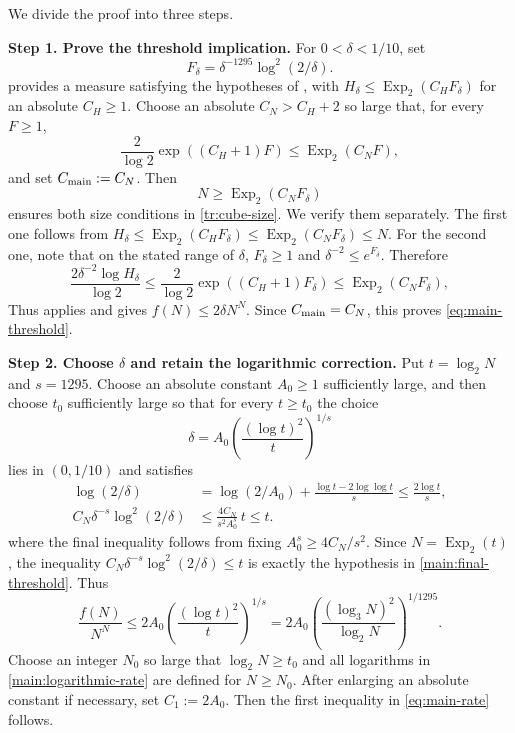 \documentclass[twoside]{aomart}
\makeatletter
\theoremstyle{paperplain}
\theoremstyle{paperdefinition}
\renewenvironment{proof}[1][\proofname]{\par\pushQED{\qed}%
  \normalfont\topsep6\p@\@plus3\p@\relax\trivlist
  \item[\hskip\labelsep\itshape #1\@addpunct{.}]\ignorespaces
}{\popQED\endtrivlist\@endpefalse}
\numberwithin{equation}{section}
\makeatother
\begin{document}
\begin{proof}[Proof of \Cref{thm:main}]
We divide the proof into three steps.	
	
\par
\medskip
\noindent\textbf{Step 1. Prove the threshold implication.}
For $0<\delta<1/10$, set
\begin{equation*}
 F_\delta=\delta^{-1295}\log^2(2/\delta).
\end{equation*}
 provides a measure satisfying
the hypotheses of , with
$H_\delta\le\operatorname{Exp}_2(C_HF_\delta)$ for an absolute
$C_H\ge1$.  Choose an absolute $C_N>C_H+2$ so large that, for every
$F\ge1$,
\[
 \frac2{\log2}\exp((C_H+1)F)\le\operatorname{Exp}_2(C_NF),
\]
and set $C_{\rm main}:=C_N$.
Then
\begin{equation}
 N\ge\operatorname{Exp}_2(C_NF_\delta)
 \label{main:final-threshold}
\end{equation}
ensures both size conditions in \eqref{tr:cube-size}.  We verify them
separately.  The first one follows from
$H_\delta\le\operatorname{Exp}_2(C_HF_\delta)\le
\operatorname{Exp}_2(C_NF_\delta)\le N$.  For the second one, note that
on the stated range of $\delta$, $F_\delta\ge1$ and
$\delta^{-2}\le e^{F_\delta}$.  Therefore
\begin{equation*}
 \frac{2\delta^{-2}\log H_\delta}{\log2}
 \le\frac2{\log2}\exp((C_H+1)F_\delta)
 \le\operatorname{Exp}_2(C_NF_\delta),
\end{equation*}
Thus
 applies and gives
$f(N)\le2\delta N^N$.  Since $C_{\rm main}=C_N$, this proves
\eqref{eq:main-threshold}.

\par
\medskip
\noindent\textbf{Step 2. Choose $\delta$ and retain the logarithmic correction.}
Put $t=\log_2N$ and $s=1295$.  Choose an absolute constant
$A_0\ge1$ sufficiently large, and then choose $t_0$ sufficiently large
so that for every $t\ge t_0$ the choice
\begin{equation*}
 \delta=A_0\left(\frac{(\log t)^2}{t}\right)^{1/s}
\end{equation*}
lies in $(0,1/10)$ and satisfies
\begin{align*}
 \log(2/\delta)
 &=\log(2/A_0)+\frac{\log t-2\log\log t}{s}
 \le\frac{2\log t}{s},\\
 C_N\delta^{-s}\log^2(2/\delta)
 &\le\frac{4C_N}{s^2A_0^s}\,t\le t.
\end{align*}
where the final inequality follows from fixing
$A_0^s\ge4C_N/s^2$.  Since $N=\operatorname{Exp}_2(t)$, the inequality
$C_N\delta^{-s}\log^2(2/\delta)\le t$ is exactly the hypothesis in
\eqref{main:final-threshold}.  Thus
\begin{equation}
 \frac{f(N)}{N^N}
 \le 2A_0\left(\frac{(\log t)^2}{t}\right)^{1/s}
 =2A_0\left(\frac{(\log_3N)^2}{\log_2N}\right)^{1/1295}.
 \label{main:logarithmic-rate}
\end{equation}
Choose an integer $N_0$ so large that $\log_2N\ge t_0$ and all
logarithms in \eqref{main:logarithmic-rate} are defined for $N\ge N_0$.
After enlarging an absolute constant if necessary, set $C_1:=2A_0$.
Then the first inequality in \eqref{eq:main-rate} follows.


\end{proof}
\end{document}
